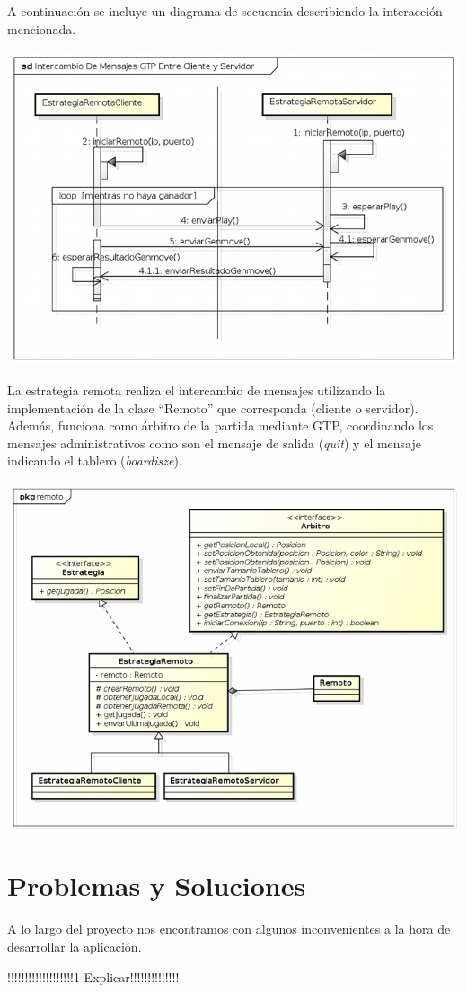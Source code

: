 \documentclass[11pt]{article}
\begin{document}
A continuaci\'on se incluye un diagrama de secuencia describiendo la interacci\'on mencionada.

\begin{center}
 \includegraphics[scale=0.9]{./Diagramas/DiagramaRemoto/secuencia_estrategiaRemoto.png}
\end{center}

La estrategia remota realiza el intercambio de mensajes utilizando la implementaci\'on de la clase ``Remoto'' que corresponda (cliente o servidor).
Adem\'as, funciona como \'arbitro de la partida mediante GTP, coordinando los mensajes administrativos
como son el mensaje de salida (\textit{quit}) y el mensaje indicando el tablero (\textit{boardisze}).

\begin{center}
 \includegraphics[scale=1.0]{./Diagramas/DiagramaRemoto/diagrama_estrategiaRemoto.png}
\end{center}

\newpage
\appendix
\section{Problemas y Soluciones}
A lo largo del proyecto nos encontramos con algunos inconvenientes a la hora de desarrollar la aplicaci\'on.

!!!!!!!!!!!!!!!!!!!1 Explicar!!!!!!!!!!!!!!
\end{document}
